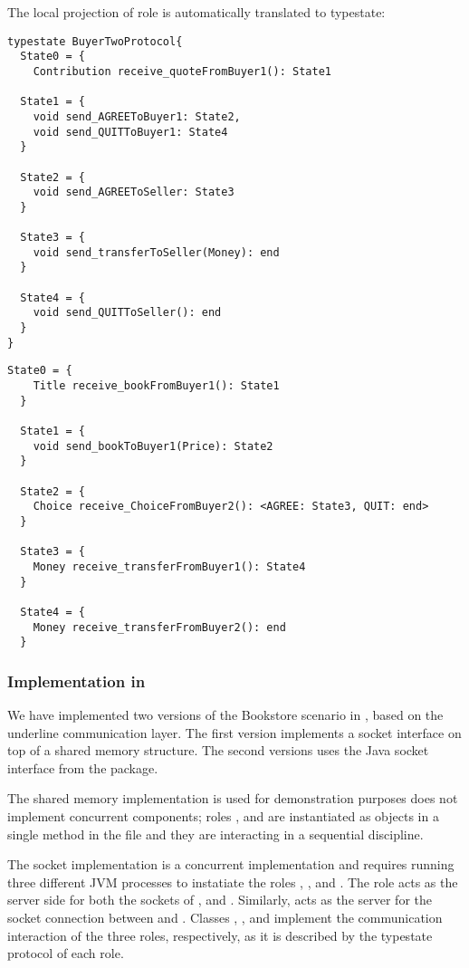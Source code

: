 The local projection of role \BuyerTwo is automatically translated to typestate:

\begin{lstlisting}[caption={Typestate for Role \BuyerTwo}]
typestate BuyerTwoProtocol{
  State0 = {
    Contribution receive_quoteFromBuyer1(): State1

  State1 = {
    void send_AGREEToBuyer1: State2,
    void send_QUITToBuyer1: State4
  }

  State2 = {
    void send_AGREEToSeller: State3
  }

  State3 = {
    void send_transferToSeller(Money): end
  }

  State4 = {
    void send_QUITToSeller(): end
  }
}
\end{lstlisting}


\begin{lstlisting}[caption={Typestate for Role \Seller}]
  State0 = {
    Title receive_bookFromBuyer1(): State1
  }

  State1 = {
    void send_bookToBuyer1(Price): State2
  }

  State2 = {
    Choice receive_ChoiceFromBuyer2(): <AGREE: State3, QUIT: end>
  }

  State3 = {
    Money receive_transferFromBuyer1(): State4
  }

  State4 = {
    Money receive_transferFromBuyer2(): end
  }
\end{lstlisting}

\subsubsection{Implementation in \Mungo}

We have implemented two versions of the Bookstore scenario in
\Mungo, based on the underline communication layer. The first
version implements a socket interface on top of a shared
memory structure. The second versions uses the Java socket
interface from the  package.

The shared memory implementation is used for demonstration purposes
does not implement concurrent components; roles \BuyerOne,
\BuyerTwo and \Seller are instantiated as objects in a single
method in the  file and they are interacting
in a sequential discipline.

The socket implementation is a concurrent implementation and
requires running three different JVM processes to instatiate
the roles \BuyerOne, \BuyerTwo, and \Seller. The \Seller role
acts as the server side for both the sockets of
\BuyerOne, and \BuyerTwo. Similarly, \BuyerTwo acts as the server
for the socket connection between \BuyerOne and \BuyerTwo.
Classes , , and
 implement the communication interaction
of the three roles, respectively, as it is described by the
typestate protocol of each role.







